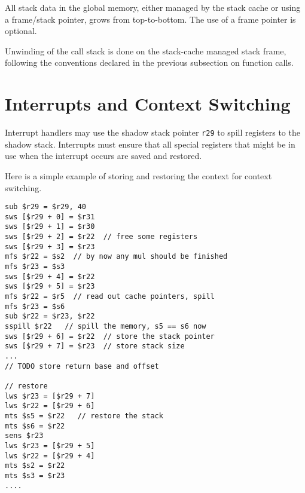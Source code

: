 All stack data in the global memory, either managed by the stack cache or using
a frame/stack pointer, grows from top-to-bottom. The use of a frame pointer is
optional.

Unwinding of the call stack is done on the stack-cache managed stack frame,
following the conventions declared in the previous subsection on function calls.

\section{Interrupts and Context Switching}

Interrupt handlers may use the shadow stack pointer \texttt{r29} to spill registers
to the shadow stack. Interrupts must ensure that all special registers that might be in use
when the interrupt occurs are saved and restored.

Here is a simple example of storing and restoring the context for context switching.
\begin{verbatim}
sub $r29 = $r29, 40
sws [$r29 + 0] = $r31
sws [$r29 + 1] = $r30
sws [$r29 + 2] = $r22  // free some registers
sws [$r29 + 3] = $r23
mfs $r22 = $s2  // by now any mul should be finished
mfs $r23 = $s3
sws [$r29 + 4] = $r22
sws [$r29 + 5] = $r23
mfs $r22 = $r5  // read out cache pointers, spill
mfs $r23 = $s6
sub $r22 = $r23, $r22
sspill $r22   // spill the memory, s5 == s6 now
sws [$r29 + 6] = $r22  // store the stack pointer
sws [$r29 + 7] = $r23  // store stack size
...
// TODO store return base and offset

// restore
lws $r23 = [$r29 + 7]
lws $r22 = [$r29 + 6]
mts $s5 = $r22   // restore the stack
mts $s6 = $r22
sens $r23
lws $r23 = [$r29 + 5]
lws $r22 = [$r29 + 4]
mts $s2 = $r22
mts $s3 = $r23
....
\end{verbatim}

